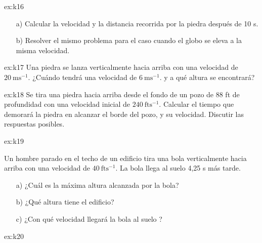 \begin{multicols}{2}
\begin{excercise}[][][a) $v=-110\ \mathrm{ms^{-1}}$,  $x=610\ \mathrm{m}$; b)  $v=-86\ \mathrm{ms^{-1}}$,  $x=-370\ \mathrm{m}$;]{ex:k16}
{\begin{itemize}
                \item[a)] Calcular la velocidad y la distancia recorrida por la piedra después de 10 s. 
                \item[b)] Resolver el mismo problema para el caso cuando el globo se eleva a la misma velocidad.
            \end{itemize}
        }
    \end{excercise}
    \begin{excercise}[][][$t=1.43\ \mathrm{s}$; $x=18.6\ \mathrm{m}$]{ex:k17}{
         Una piedra se lanza verticalmente hacia arriba con una velocidad de  $20\  \mathrm{ms^{-1}}$. ¿Cuándo tendrá una velocidad de  $6\  \mathrm{ms^{-1}}$. y a qué altura se encontrará?  
         }
    \end{excercise}
    \begin{excercise}[][][a) $v=227.2\ \mathrm{fts^{-1}}$,  $t_1=14.6\ \mathrm{s}$,  $t_2=0.4\ \mathrm{s}$;]{ex:k18}{
         Se tira una piedra hacia arriba desde el fondo de un pozo de 88 ft de profundidad con una velocidad inicial de $240 \ \mathrm{fts^{-1}}$. Calcular el tiempo que demorará la piedra en alcanzar el borde del pozo, y su velocidad. Discutir las respuestas posibles. 
         }
    \end{excercise}
    \begin{excercise}[][][a) $h_{\mathrm{max}}=25\ \mathrm{ft}$, b) $h=119\ \mathrm{ft}$; c)  $v=99\ \mathrm{fts^{-1}}$]{ex:k19}{
         Un hombre parado en el techo de un edificio tira una bola verticalmente hacia arriba con una velocidad de  $40 \ \mathrm{fts^{-1}}$. La bola llega al suelo 4,25 s más tarde. 
            \begin{itemize}
                \item[a)] ¿Cuál es la máxima altura alcanzada por la bola? 
                \item[b)] ¿Qué altura tiene el edificio? 
                \item[c)] ¿Con qué velocidad llegará la bola al suelo ?
            \end{itemize}
         }
    \end{excercise}
    \begin{excercise}[][][$h=900\ \mathrm{ft}$,  $t=7.5\ \mathrm{s}$]{ex:k20}{
}
\end{excercise}
\end{multicols}
